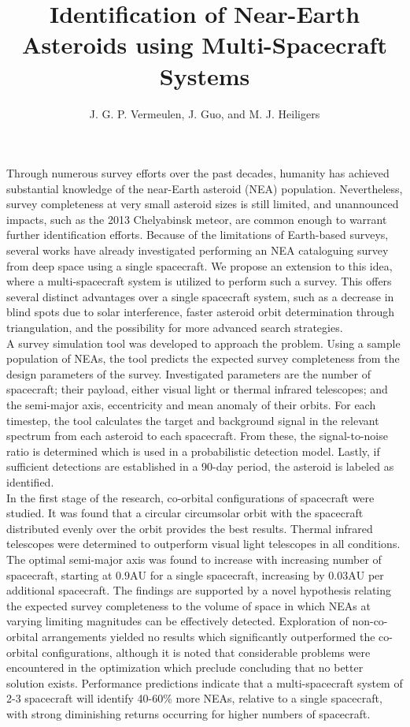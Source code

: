 \documentclass{article}
\title{Identification of Near-Earth Asteroids using Multi-Spacecraft Systems}
\author{J. G. P. Vermeulen, J. Guo, and M. J. Heiligers}
\date{}
\begin{document}
\maketitle

\noindent Through numerous survey efforts over the past decades, humanity has achieved substantial knowledge of the near-Earth asteroid (NEA) population. Nevertheless, survey completeness at very small asteroid sizes is still limited, and unannounced impacts, such as the 2013 Chelyabinsk meteor, are common enough to warrant further identification efforts. Because of the limitations of Earth-based surveys, several works have already investigated performing an NEA cataloguing survey from deep space using a single spacecraft. We propose an extension to this idea, where a multi-spacecraft system is utilized to perform such a survey. This offers several distinct advantages over a single spacecraft system, such as a decrease in blind spots due to solar interference, faster asteroid orbit determination through triangulation, and the possibility for more advanced search strategies.\\

\noindent A survey simulation tool was developed to approach the problem. Using a sample population of NEAs, the tool predicts the  expected survey completeness from the design parameters of the survey. Investigated parameters are the number of spacecraft; their payload, either visual light or thermal infrared telescopes; and the semi-major axis, eccentricity and mean anomaly of their orbits. For each timestep, the tool calculates the target and background signal in the relevant spectrum from each asteroid to each spacecraft. From these, the signal-to-noise ratio is determined which is used in a probabilistic detection model. Lastly, if sufficient detections are established in a 90-day period, the asteroid is labeled as identified.\\

\noindent In the first stage of the research, co-orbital configurations of spacecraft were studied. It was found that a circular circumsolar orbit with the spacecraft distributed evenly over the orbit provides the best results. Thermal infrared telescopes were determined to outperform visual light telescopes in all conditions. The optimal semi-major axis was found to increase with increasing number of spacecraft, starting at $0.9\mathrm{AU}$ for a single spacecraft, increasing by $0.03\mathrm{AU}$ per additional spacecraft.  The findings are supported by a novel hypothesis relating the expected survey completeness to the volume of space in which NEAs at varying limiting magnitudes can be effectively detected. Exploration of non-co-orbital arrangements yielded no results which significantly outperformed the co-orbital configurations, although it is noted that considerable problems were encountered in the optimization which preclude concluding that no better solution exists. Performance predictions indicate that a multi-spacecraft system of 2-3 spacecraft will identify 40-60\% more NEAs, relative to a single spacecraft, with strong diminishing returns occurring for higher numbers of spacecraft.
\end{document}
